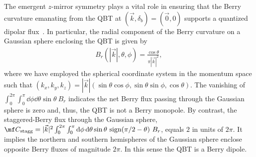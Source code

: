 \documentclass[reprint,floatfix, twocolumn]{revtex4-1}
\begin{document}
The emergent $z$-mirror symmetry plays a vital role in ensuring that the Berry curvature emanating from the QBT at $(\vec k,\delta_b)=(\vec{0},0)$ supports a quantized dipolar flux~\cite{nelson2022}.  
In particular, the radial component of the Berry curvature on a  Gaussian sphere enclosing the QBT is given by~\cite{tyner2024dipolar}
\begin{align}\label{eq:BerryRadialComponent}
B_r(|\vec k|, \theta, \phi) = \frac{\cos\theta}{\pi |\vec k|^2},
\end{align}
where we have employed the spherical coordinate system in the momentum space such that $(k_x, k_y, k_z) = |\vec k|(\sin\theta \cos\phi, \sin\theta \sin\phi, \cos\theta)$.
The vanishing of $ \int_{0}^{2\pi} \int_0^\pi \dd{\phi} \dd{\theta} \sin\theta ~ B_r$ indicates the net Berry flux passing through the Gaussian sphere is zero and, thus,  the QBT is not a Berry monopole.
By contrast, the staggered-Berry flux through the Gaussian sphere,  $\mf C_{\text{stagg}} = |\vec k|^2 \int_{0}^{2\pi} \int_0^\pi \dd{\phi} \dd{\theta} \sin\theta 
~\mbox{sign}(\pi/2-\theta)~ B_r$, equals $2$ in units of $2\pi$. 
It implies the northern and southern hemispheres of the Gaussian sphere enclose opposite Berry fluxes of magnitude $2\pi$.
In this sense the QBT is a Berry dipole. 
\end{document}
